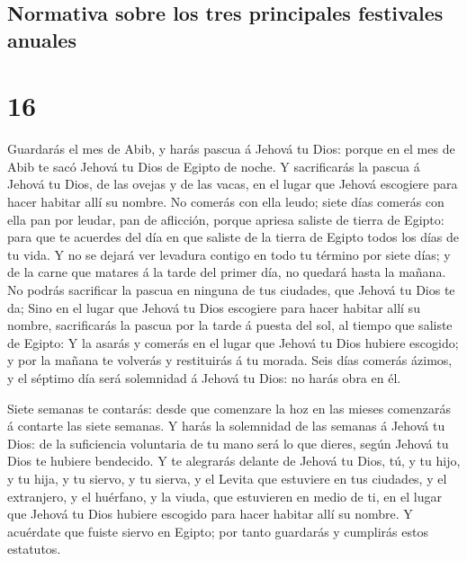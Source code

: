\hypertarget{normativa-sobre-los-tres-principales-festivales-anuales}{%
\subsection{Normativa sobre los tres principales festivales
anuales}\label{normativa-sobre-los-tres-principales-festivales-anuales}}

\hypertarget{section-05-16}{%
\section{16}\label{section-05-16}}

 Guardarás el mes de Abib, y harás pascua á Jehová tu
Dios: porque en el mes de Abib te sacó Jehová tu Dios de Egipto de
noche.  Y sacrificarás la pascua á Jehová tu Dios, de las
ovejas y de las vacas, en el lugar que Jehová escogiere para hacer
habitar allí su nombre.  No comerás con ella leudo; siete
días comerás con ella pan por leudar, pan de aflicción, porque apriesa
saliste de tierra de Egipto: para que te acuerdes del día en que saliste
de la tierra de Egipto todos los días de tu vida.  Y no se
dejará ver levadura contigo en todo tu término por siete días; y de la
carne que matares á la tarde del primer día, no quedará hasta la mañana.
 No podrás sacrificar la pascua en ninguna de tus
ciudades, que Jehová tu Dios te da;  Sino en el lugar que
Jehová tu Dios escogiere para hacer habitar allí su nombre, sacrificarás
la pascua por la tarde á puesta del sol, al tiempo que saliste de
Egipto:  Y la asarás y comerás en el lugar que Jehová tu
Dios hubiere escogido; y por la mañana te volverás y restituirás á tu
morada.  Seis días comerás ázimos, y el séptimo día será
solemnidad á Jehová tu Dios: no harás obra en él.

 Siete semanas te contarás: desde que comenzare la hoz en
las mieses comenzarás á contarte las siete semanas.  Y
harás la solemnidad de las semanas á Jehová tu Dios: de la suficiencia
voluntaria de tu mano será lo que dieres, según Jehová tu Dios te
hubiere bendecido.  Y te alegrarás delante de Jehová tu
Dios, tú, y tu hijo, y tu hija, y tu siervo, y tu sierva, y el Levita
que estuviere en tus ciudades, y el extranjero, y el huérfano, y la
viuda, que estuvieren en medio de ti, en el lugar que Jehová tu Dios
hubiere escogido para hacer habitar allí su nombre.  Y
acuérdate que fuiste siervo en Egipto; por tanto guardarás y cumplirás
estos estatutos.

